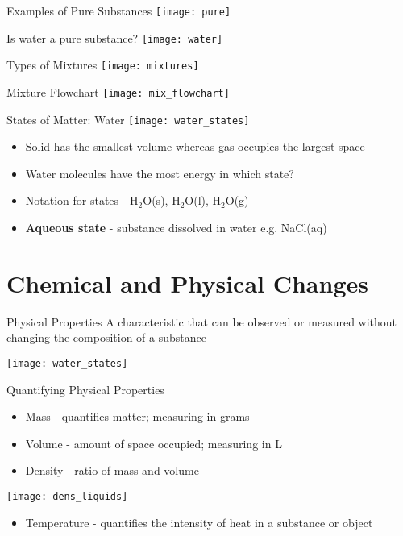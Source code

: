 \documentclass[11pt]{beamer}
\begin{document}
\begin{frame}{Examples of Pure Substances}
  \centering
  \texttt{[image: pure]}
\end{frame}

\begin{frame}{Is water a pure substance?}
  \centering
  \texttt{[image: water]}
\end{frame}

\begin{frame}{Types of Mixtures}
  \centering
  \texttt{[image: mixtures]}
\end{frame}

\begin{frame}{Mixture Flowchart}
  \centering
  \texttt{[image: mix\_flowchart]}
\end{frame}

\begin{frame}{States of Matter: Water}
  \centering
  \texttt{[image: water\_states]}
  \vspace{-0.2in}
  \begin{itemize}
  \item Solid has the smallest volume whereas gas occupies
    the largest space
  \item Water molecules have the most energy in which state?
  \item Notation for states - H$_2$O(s), H$_2$O(l), H$_2$O(g)
  \item \textbf{Aqueous state} - substance dissolved in water
    e.g. NaCl(aq)
  \end{itemize}
\end{frame}

\section{Chemical and Physical Changes}

\begin{frame}{Physical Properties}
  A characteristic that can be observed or measured without
  changing the composition of a substance
  
  \centering
  \texttt{[image: water\_states]}
\end{frame}

\begin{frame}{Quantifying Physical Properties}
  \begin{itemize}
  \item Mass - quantifies matter; measuring in grams
  \item Volume - amount of space occupied; measuring in L
  \item Density - ratio of mass and volume
  \end{itemize}
  \centering
  \texttt{[image: dens\_liquids]}
  \begin{itemize}
  \item Temperature - quantifies the intensity of heat in a substance
    or object
  \end{itemize}
\end{frame}
\end{document}
